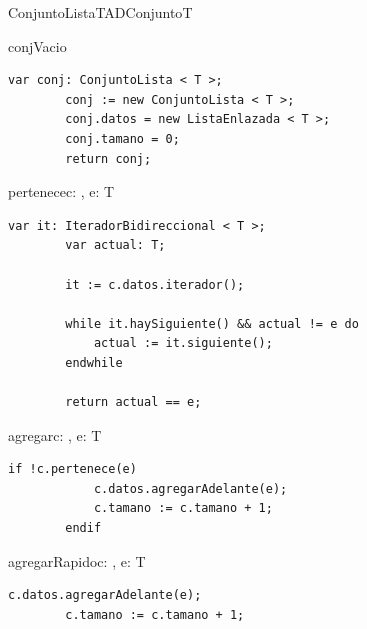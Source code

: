 \begin{module}{ConjuntoLista}{TAD}{Conjunto}{T}



	\begin{proc}{conjVacio}{}{\moduletype}
		\begin{lstlisting}[numbers=none,frame=none]
		var conj: ConjuntoLista < T >;
		conj := new ConjuntoLista < T >;
		conj.datos = new ListaEnlazada < T >;
		conj.tamano = 0;
		return conj;
		\end{lstlisting}
	\end{proc}

	\begin{proc}{pertenece}{\In c: \moduletype, \In e: T}{\bool}
		\begin{lstlisting}[numbers=none,frame=none]
		var it: IteradorBidireccional < T >;
		var actual: T;

		it := c.datos.iterador();

		while it.haySiguiente() && actual != e do
			actual := it.siguiente();
		endwhile
		
		return actual == e;
		\end{lstlisting}
	\end{proc}

	\begin{proc}{agregar}{\Inout c: \moduletype, \In e: T}{}
		\begin{lstlisting}[numbers=none,frame=none]
		if !c.pertenece(e)
			c.datos.agregarAdelante(e);
			c.tamano := c.tamano + 1;
		endif
		\end{lstlisting}
	\end{proc}

	\begin{proc}{agregarRapido}{\Inout c: \moduletype, \In e: T}{}
		\begin{lstlisting}[numbers=none,frame=none]
		c.datos.agregarAdelante(e);
		c.tamano := c.tamano + 1;
		\end{lstlisting}
	\end{proc}


\end{module}
